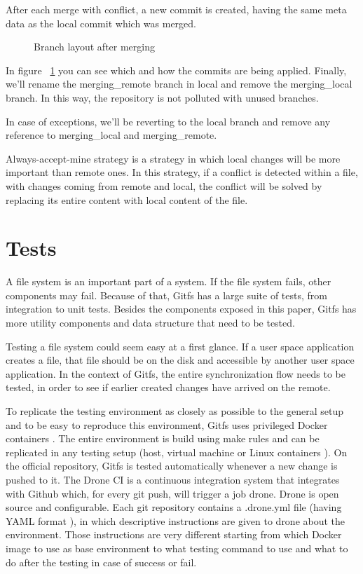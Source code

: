After each merge with conflict, a new commit is created, having the same meta data as the local commit which was merged.

\begin{figure}[h]
  \begin{center}
    \def\svgwidth{\columnwidth}
    
  \end{center}
  \caption{Branch layout after merging}
  \label{fig:merging}
\end{figure}

In figure ~\ref{fig:merging} you can see which and how the commits are being applied. Finally, we'll rename the merging\_remote branch in local and remove the merging\_local branch. In this way, the repository is not polluted with unused branches.

In case of exceptions, we'll be reverting to the local branch and remove any reference to merging\_local and merging\_remote.

Always-accept-mine strategy is a strategy in which local changes will be more important than remote ones. In this strategy, if a conflict is detected within a file, with changes coming from remote and local, the conflict will be solved by replacing its entire content with local content of the file.

\section{Tests}

A file system is an important part of a system. If the file system fails, other components may fail. Because of that, Gitfs has a large suite of tests, from integration to unit tests. Besides the components exposed in this paper, Gitfs has more utility components and data structure that need to be tested.

Testing a file system could seem easy at a first glance. If a user space application creates a file, that file should be on the disk and accessible by another user space application. In the context of Gitfs, the entire synchronization flow needs to be tested, in order to see if earlier created changes have arrived on the remote.

To replicate the testing environment as closely as possible to the general setup and to be easy to reproduce this environment, Gitfs uses privileged Docker containers \cite{Merkel2014}. The entire environment is build using make rules and can be replicated in any testing setup (host, virtual machine or Linux containers \cite{Rosen2014}). On the official repository, Gitfs is tested automatically whenever a new change is pushed to it. The Drone CI \cite{Drone2016} is a continuous integration system that integrates with Github which, for every git push, will trigger a job drone. Drone is open source and configurable. Each git repository contains a .drone.yml file (having YAML format \cite{Ben-Kiki2009}), in which descriptive instructions are given to drone about the environment. Those instructions are very different starting from which Docker image to use as base environment to what testing command to use and what to do after the testing in case of success or fail.

